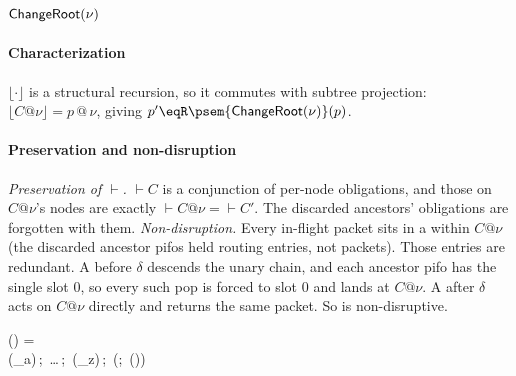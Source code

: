 
\subsubsection{\texorpdfstring{\(\textsf{ChangeRoot}(\nu)\)}{ChangeRoot}}

\paragraph{Characterization}
\(\lfloor \cdot \rfloor\) is a structural recursion, so it commutes with subtree projection: \(\lfloor C@\nu \rfloor = p \mathbin{@} \nu\), giving \(p' \eqR \psem{\ChangeRoot(\nu)}(p)\).

\paragraph{Preservation and non-disruption}

\emph{Preservation of \(\vdash\).} \(\vdash C\) is a conjunction of per-node obligations, and those on \(C@\nu\)'s nodes are exactly \(\vdash C@\nu = \vdash C'\).
The discarded ancestors' obligations are forgotten with them.
\emph{Non-disruption.} Every in-flight packet sits in a \pifo within \(C@\nu\) (the discarded ancestor pifos held routing entries, not packets).
Those entries are redundant.
A \pop{} before \(\delta\) descends the unary chain, and each ancestor pifo has the single slot \(0\), so every such pop is forced to slot \(0\) and lands at \(C@\nu\).
A \pop{} after \(\delta\) acts on \(C@\nu\) directly and returns the same packet.
So \ChangeRoot{} is non-disruptive.



\PruneDownTo() \;=\;\\
\quad \Retire(\pi_a)\,;\, \ldots\,;\, \Retire(\pi_z)\,;\, (;\, \ChangeRoot())



